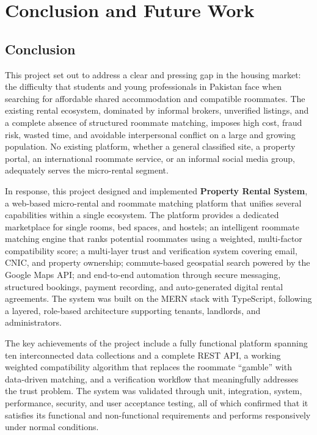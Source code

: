 
\chapter{Conclusion and Future Work}


\section{Conclusion}

This project set out to address a clear and pressing gap in the housing market: the difficulty that students and young professionals in Pakistan face when searching for affordable shared accommodation and compatible roommates. The existing rental ecosystem, dominated by informal brokers, unverified listings, and a complete absence of structured roommate matching, imposes high cost, fraud risk, wasted time, and avoidable interpersonal conflict on a large and growing population. No existing platform, whether a general classified site, a property portal, an international roommate service, or an informal social media group, adequately serves the micro-rental segment.

In response, this project designed and implemented \textbf{Property Rental System}, a web-based micro-rental and roommate matching platform that unifies several capabilities within a single ecosystem. The platform provides a dedicated marketplace for single rooms, bed spaces, and hostels; an intelligent roommate matching engine that ranks potential roommates using a weighted, multi-factor compatibility score; a multi-layer trust and verification system covering email, CNIC, and property ownership; commute-based geospatial search powered by the Google Maps API; and end-to-end automation through secure messaging, structured bookings, payment recording, and auto-generated digital rental agreements. The system was built on the MERN stack with TypeScript, following a layered, role-based architecture supporting tenants, landlords, and administrators.

The key achievements of the project include a fully functional platform spanning ten interconnected data collections and a complete REST API, a working weighted compatibility algorithm that replaces the roommate ``gamble'' with data-driven matching, and a verification workflow that meaningfully addresses the trust problem. The system was validated through unit, integration, system, performance, security, and user acceptance testing, all of which confirmed that it satisfies its functional and non-functional requirements and performs responsively under normal conditions.

